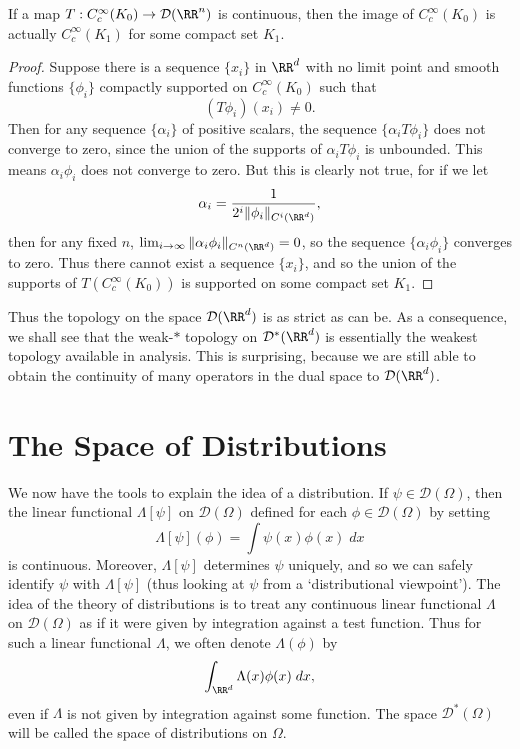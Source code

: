 \begin{theorem}
    If a map $T: C_c^\infty(K_0) \to \mathcal{D}(\RR^n)$ is continuous, then the image of $C_c^\infty(K_0)$ is actually $C_c^\infty(K_1)$ for some compact set $K_1$.
\end{theorem}
\begin{proof}
    Suppose there is a sequence $\{ x_i \}$ in $\RR^d$ with no limit point and smooth functions $\{ \phi_i \}$ compactly supported on $C_c^\infty(K_0)$ such that
    \[ (T\phi_i)(x_i) \neq 0. \]
    Then for any sequence $\{ \alpha_i \}$ of positive scalars, the sequence $\{ \alpha_i T\phi_i \}$ does not converge to zero, since the union of the supports of $\alpha_i T\phi_i$ is unbounded. This means $\alpha_i \phi_i$ does not converge to zero. But this is clearly not true, for if we let
    \[ \alpha_i = \frac{1}{2^i \| \phi_i \|_{C^i(\RR^d)}}, \]
    then for any fixed $n$, $\lim_{i \to \infty} \| \alpha_i \phi_i \|_{C^n(\RR^d)} = 0$, so the sequence $\{ \alpha_i \phi_i \}$ converges to zero. Thus there cannot exist a sequence $\{ x_i \}$, and so the union of the supports of $T(C_c^\infty(K_0))$ is supported on some compact set $K_1$.
\end{proof}

Thus the topology on the space $\mathcal{D}(\RR^d)$ is as strict as can be. As a consequence, we shall see that the weak-$*$ topology on $\mathcal{D}^*(\RR^d)$ is essentially the weakest topology available in analysis. This is surprising, because we are still able to obtain the continuity of many operators in the dual space to $\mathcal{D}(\RR^d)$.

\section{The Space of Distributions}

We now have the tools to explain the idea of a distribution. If $\psi \in \mathcal{D}(\Omega)$, then the linear functional $\Lambda[\psi]$ on $\mathcal{D}(\Omega)$ defined for each $\phi \in \mathcal{D}(\Omega)$ by setting
%
\[ \Lambda[\psi](\phi) = \int \psi(x) \phi(x)\; dx \]
%
is continuous. Moreover, $\Lambda[\psi]$ determines $\psi$ uniquely, and so we can safely identify $\psi$ with $\Lambda[\psi]$ (thus looking at $\psi$ from a `distributional viewpoint'). The idea of the theory of distributions is to treat any continuous linear functional $\Lambda$ on $\mathcal{D}(\Omega)$ as if it were given by integration against a test function. Thus for such a linear functional $\Lambda$, we often denote $\Lambda(\phi)$ by
%
\[ \int_{\RR^d} \Lambda(x) \phi(x)\; dx, \]
%
even if $\Lambda$ is not given by integration against some function. The space $\mathcal{D}^*(\Omega)$ will be called the space of distributions on $\Omega$.

